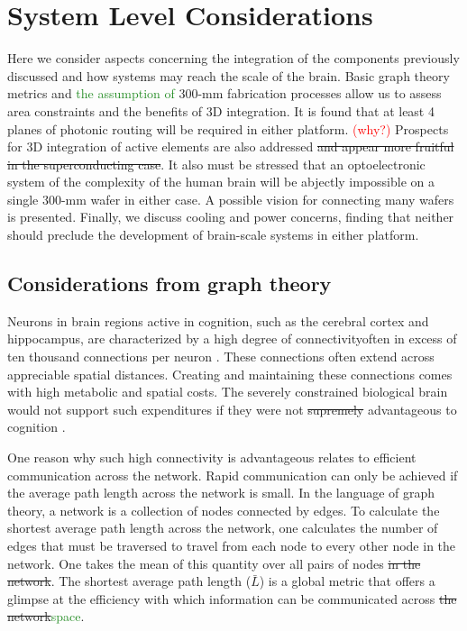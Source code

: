 \documentclass[twocolumn]{article}
\begin{document}
\section{\label{sec:instantiation}System Level Considerations}
Here we consider aspects concerning the integration of the components previously discussed and how systems may reach the scale of the brain. Basic graph theory metrics and \textcolor{ForestGreen}{the assumption of} 300-mm fabrication processes allow us to assess area constraints and the benefits of 3D integration. It is found that at least 4 planes of photonic routing will be required in either platform. \textcolor{red}{(why?)} Prospects for 3D integration of active elements are also addressed\sout{ and appear more fruitful in the superconducting case}. It also must be stressed that an optoelectronic system of the complexity of the human brain will be abjectly impossible on a single 300-mm wafer in either case. A possible vision for connecting many wafers is presented. Finally, we discuss cooling and power concerns, finding that neither should preclude the development of brain-scale systems in either platform.

\subsection{Considerations from graph theory}
Neurons in brain regions active in cognition, such as the cerebral cortex and hippocampus, are characterized by a high degree of connectivity\textemdash often in excess of ten thousand connections per neuron \cite{brsc1998,bu2006}. These connections often extend across appreciable spatial distances. Creating and maintaining these connections comes with high metabolic and spatial costs. The severely constrained biological brain would not support such expenditures if they were not \sout{supremely} advantageous to cognition \cite{busp2012}.

One reason why such high connectivity is advantageous relates to efficient communication across the network. Rapid communication can only be achieved if the average path length across the network is small. In the language of graph theory, a network is a collection of nodes connected by edges. To calculate the shortest average path length across the network, one calculates the number of edges that must be traversed to travel from each node to every other node in the network. One takes the mean of this quantity over all pairs of nodes\sout{ in the network}. The shortest average path length ($\bar{L}$) is a global metric that offers a glimpse at the efficiency with which information can be communicated across \sout{the network}\textcolor{ForestGreen}{space}.
\end{document}
